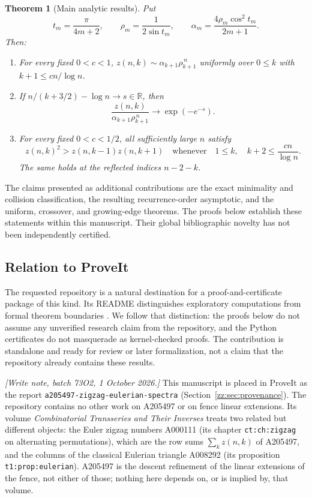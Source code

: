 \documentclass[11pt,a4paper]{article}
\newtheorem{theorem}{Theorem}[section]
\theoremstyle{definition}
\newcommand{\R}{\mathbb{R}}
\begin{document}
\begin{theorem}[Main analytic results]
\label{zz:thm:main-analysis}
Put
\begin{equation}\label{zz:eq:rho-alpha-intro}
 t_m=\frac{\pi}{4m+2},\qquad
 \rho_m=\frac{1}{2\sin t_m},\qquad
 \alpha_m=\frac{4\rho_m\cos^2t_m}{2m+1}.
\end{equation}
Then:
\begin{enumerate}[label=(\roman*)]
\item For every fixed $0<c<1$,
$z(n,k)\sim\alpha_{k+1}\rho_{k+1}^{\,n}$ uniformly over
$0\le k$ with $k+1\le c n/\log n$.
\item If $n/(k+3/2)-\log n\to s\in\R$, then
\begin{equation}\label{zz:eq:main-crossover}
 \frac{z(n,k)}{\alpha_{k+1}\rho_{k+1}^{\,n}}
 \longrightarrow \exp(-e^{-s}).
\end{equation}
\item For every fixed $0<c<1/2$, all sufficiently large $n$ satisfy
\begin{equation}\label{zz:eq:main-lc}
 z(n,k)^2>z(n,k-1)z(n,k+1)
 \quad\text{whenever}\quad 1\le k,\quad k+2\le\frac{cn}{\log n}.
\end{equation}
The same holds at the reflected indices $n-2-k$.
\end{enumerate}
\end{theorem}

The claims presented as additional contributions are the exact minimality and
collision classification, the resulting recurrence-order asymptotic, and the
uniform, crossover, and growing-edge theorems.  The proofs below establish
these statements within this manuscript.  Their global bibliographic novelty
has not been independently certified.

\subsection{Relation to ProveIt}
The requested repository is a natural destination for a proof-and-certificate
package of this kind.  Its README distinguishes exploratory computations from
formal theorem boundaries \cite{proveit}.  We follow that distinction: the
proofs below do not assume any unverified research claim from the repository,
and the Python certificates do not masquerade as kernel-checked proofs.
The contribution is standalone and ready for review or later formalization,
not a claim that the repository already contains these results.

\emph{[Write note, batch 73O2, 1 October 2026.]} This manuscript is
placed in ProveIt as the report \texttt{a205497-zigzag-eulerian-spectra}
(Section~\ref{zz:sec:provenance}). The repository contains no other work on
A205497 or on fence linear extensions. Its volume \emph{Combinatorial
Transseries and Their Inverses} \cite{cti} treats two related but different
objects: the Euler zigzag numbers A000111 (its chapter \texttt{ct:ch:zigzag} on
alternating permutations), which are the row sums $\sum_kz(n,k)$ of A205497, and the
columns of the classical Eulerian triangle A008292 (its proposition
\texttt{t1:prop:eulerian}). A205497 is the descent refinement of the linear
extensions of the fence, not either of those; nothing here depends on, or
is implied by, that volume.
\end{document}
